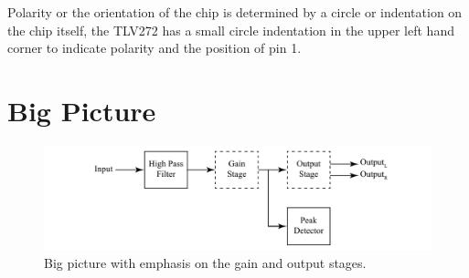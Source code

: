 Polarity or the orientation of the chip is determined by a circle or indentation on the chip itself, the TLV272 has a small circle indentation in the upper left hand corner to indicate polarity and the position of pin 1. 

%
%

\section{Big Picture}

\begin{figure} [h]
	\centering
		\includegraphics[width=1\textwidth]{Lab5bigpicture.pdf}
	\caption{Big picture with emphasis on the gain and output stages.} \label{fig:5bp}
\end{figure}

